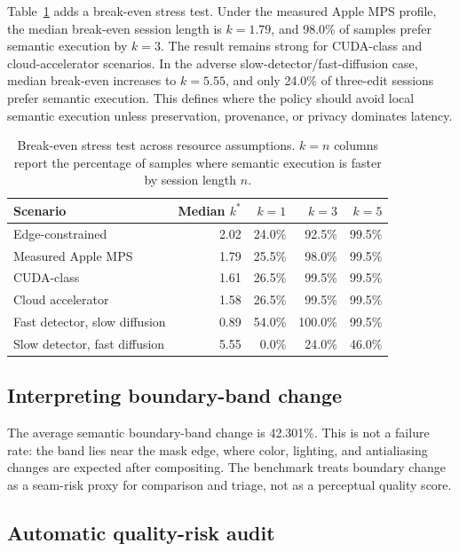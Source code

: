 \documentclass[final,5p,times,number,sort&compress]{elsarticle}
\begin{document}
Table~\ref{tab:stress-sim} adds a break-even stress test. Under the measured Apple MPS profile, the median break-even session length is \(k=1.79\), and 98.0\% of samples prefer semantic execution by \(k=3\). The result remains strong for CUDA-class and cloud-accelerator scenarios. In the adverse slow-detector/fast-diffusion case, median break-even increases to \(k=5.55\), and only 24.0\% of three-edit sessions prefer semantic execution. This defines where the policy should avoid local semantic execution unless preservation, provenance, or privacy dominates latency.

\begin{table}[t]
\centering
\scriptsize
\caption{Break-even stress test across resource assumptions. \(k=n\) columns report the percentage of samples where semantic execution is faster by session length \(n\).}
\label{tab:stress-sim}
\begin{tabular}{lrrrr}
\toprule
Scenario & Median \(k^*\) & \(k=1\) & \(k=3\) & \(k=5\) \\
\midrule
Edge-constrained & 2.02 & 24.0\% & 92.5\% & 99.5\% \\
Measured Apple MPS & 1.79 & 25.5\% & 98.0\% & 99.5\% \\
CUDA-class & 1.61 & 26.5\% & 99.5\% & 99.5\% \\
Cloud accelerator & 1.58 & 26.5\% & 99.5\% & 99.5\% \\
Fast detector, slow diffusion & 0.89 & 54.0\% & 100.0\% & 99.5\% \\
Slow detector, fast diffusion & 5.55 & 0.0\% & 24.0\% & 46.0\% \\
\bottomrule
\end{tabular}
\end{table}

\subsection{Interpreting boundary-band change}

The average semantic boundary-band change is 42.301\%. This is not a failure rate: the band lies near the mask edge, where color, lighting, and antialiasing changes are expected after compositing. The benchmark treats boundary change as a seam-risk proxy for comparison and triage, not as a perceptual quality score.

\subsection{Automatic quality-risk audit}
\end{document}
